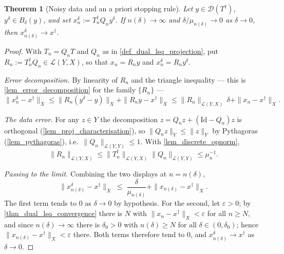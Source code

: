 \documentclass[a4paper]{report}
\theoremstyle{plain}
\newtheorem{theorem}{Theorem}[chapter]
\theoremstyle{definition}
\theoremstyle{remark}
\newcommand{\Ll}{\mathcal{L}}
\newcommand{\Dom}{\mathcal{D}}
\newcommand{\Id}{\mathrm{Id}}
\newcommand{\dg}{^{\dagger}}
\begin{document}
\begin{theorem}[Noisy data and an a priori stopping rule]
  \label{thm_dual_lsq_noisy}
  Let $y \in \Dom(T\dg)$, $y^{\delta} \in B_{\delta}(y)$, and set
  $x^{\delta}_n := T_n\dg Q_n y^{\delta}$.  If $n(\delta) \to \infty$ and
  $\delta/\mu_{n(\delta)} \to 0$ as $\delta \to 0$, then
  $x^{\delta}_{n(\delta)} \to x\dg$.
\end{theorem}

\begin{proof}
  With $T_n = Q_nT$ and $Q_n$ as in \cref{def_dual_lsq_projection}, put
  $R_n := T_n\dg Q_n \in \Ll(Y,X)$, so that $x_n = R_ny$ and
  $x^{\delta}_n = R_ny^{\delta}$.

  \emph{Error decomposition.}  By linearity of $R_n$ and the triangle inequality --- this
  is \cref{lem_error_decomposition} for the family $\{R_n\}$ ---
  \[
    \|x^{\delta}_n - x\dg\|_X \le \|R_n(y^{\delta} - y)\|_X + \|R_ny - x\dg\|_X
      \le \|R_n\|_{\Ll(Y,X)}\,\delta + \|x_n - x\dg\|_X .
  \]

  \emph{The data error.}  For any $z \in Y$ the decomposition $z = Q_nz + (\Id - Q_n)z$ is
  orthogonal (\cref{lem_proj_characterisation}), so $\|Q_nz\|_Y \le \|z\|_Y$ by Pythagoras
  (\cref{lem_pythagoras}), i.e.\ $\|Q_n\|_{\Ll(Y,Y)} \le 1$.  With
  \cref{lem_discrete_opnorm},
  \[
    \|R_n\|_{\Ll(Y,X)} \le \|T_n\dg\|_{\Ll(Y,X)}\|Q_n\|_{\Ll(Y,Y)} \le \mu_n^{-1} .
  \]

  \emph{Passing to the limit.}  Combining the two displays at $n = n(\delta)$,
  \[
    \|x^{\delta}_{n(\delta)} - x\dg\|_X
      \;\le\; \frac{\delta}{\mu_{n(\delta)}} + \|x_{n(\delta)} - x\dg\|_X .
  \]
  The first term tends to $0$ as $\delta \to 0$ by hypothesis.  For the second, let
  $\varepsilon > 0$; by \cref{thm_dual_lsq_convergence} there is $N$ with
  $\|x_n - x\dg\|_X < \varepsilon$ for all $n \ge N$, and since $n(\delta) \to \infty$
  there is $\delta_0 > 0$ with $n(\delta) \ge N$ for all $\delta \in (0,\delta_0)$; hence
  $\|x_{n(\delta)} - x\dg\|_X < \varepsilon$ there.  Both terms therefore tend to $0$, and
  $x^{\delta}_{n(\delta)} \to x\dg$ as $\delta \to 0$.
\end{proof}
\end{document}
